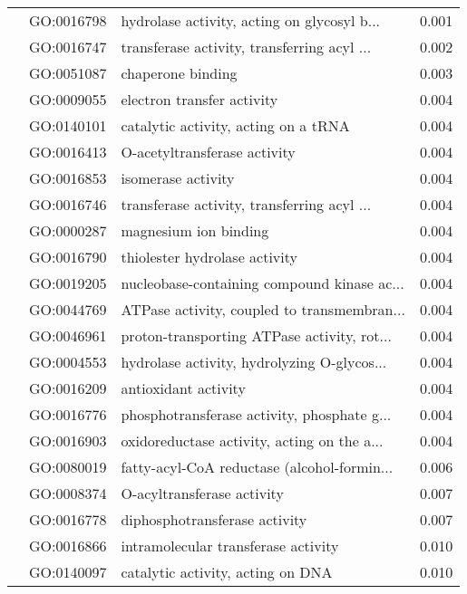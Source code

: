 \begin{longtable}{lllr}
   & GO:0016798 &  hydrolase activity, acting on glycosyl b... &         0.001 \\
   & GO:0016747 &  transferase activity, transferring acyl ... &         0.002 \\
   & GO:0051087 &                            chaperone binding &         0.003 \\
   & GO:0009055 &                   electron transfer activity &         0.004 \\
   & GO:0140101 &         catalytic activity, acting on a tRNA &         0.004 \\
   & GO:0016413 &                 O-acetyltransferase activity &         0.004 \\
   & GO:0016853 &                           isomerase activity &         0.004 \\
   & GO:0016746 &  transferase activity, transferring acyl ... &         0.004 \\
   & GO:0000287 &                        magnesium ion binding &         0.004 \\
   & GO:0016790 &                thiolester hydrolase activity &         0.004 \\
   & GO:0019205 &  nucleobase-containing compound kinase ac... &         0.004 \\
   & GO:0044769 &  ATPase activity, coupled to transmembran... &         0.004 \\
   & GO:0046961 &  proton-transporting ATPase activity, rot... &         0.004 \\
   & GO:0004553 &  hydrolase activity, hydrolyzing O-glycos... &         0.004 \\
   & GO:0016209 &                         antioxidant activity &         0.004 \\
   & GO:0016776 &  phosphotransferase activity, phosphate g... &         0.004 \\
   & GO:0016903 &  oxidoreductase activity, acting on the a... &         0.004 \\
   & GO:0080019 &  fatty-acyl-CoA reductase (alcohol-formin... &         0.006 \\
   & GO:0008374 &                   O-acyltransferase activity &         0.007 \\
   & GO:0016778 &                diphosphotransferase activity &         0.007 \\
   & GO:0016866 &          intramolecular transferase activity &         0.010 \\
   & GO:0140097 &            catalytic activity, acting on DNA &         0.010 \\

\end{longtable}
